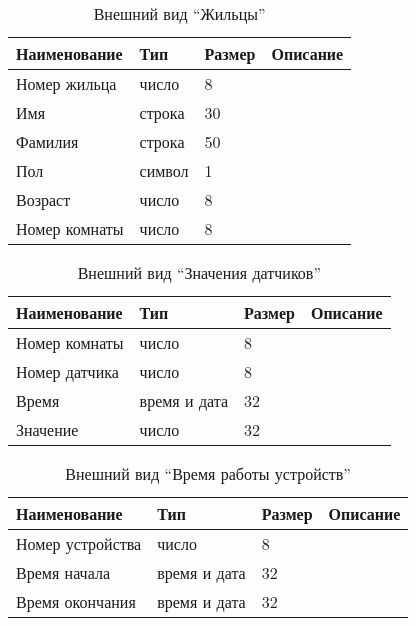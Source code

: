          \begin{table}[h!]
            \centering
            \caption{Внешний вид “Жильцы”}
            \label{sensor:size}
            \begin{tabular}{|l|l|l|l|}
            \hline
            Наименование & Тип & Размер & Описание \\ \hline
            Номер жильца & число & 8 & \\ \hline
            Имя & строка & 30 & \\ \hline
            Фамилия & строка & 50 & \\ \hline
            Пол & символ & 1 & \\ \hline
            Возраст & число & 8 & \\ \hline
            Номер комнаты & число & 8 & \\ \hline
            \end{tabular}
          \end{table}
          \begin{table}[h!]
            \centering
            \caption{Внешний вид “Значения датчиков”}
            \label{room:size}
            \begin{tabular}{|l|l|l|l|}
            \hline
            Наименование & Тип & Размер & Описание \\ \hline
            Номер комнаты & число & 8 & \\ \hline
            Номер датчика & число & 8 & \\ \hline
            Время & время и дата & 32 & \\ \hline
            Значение & число & 32 & \\ \hline
            \end{tabular}
          \end{table}
          \begin{table}[h!]
            \centering
            \caption{Внешний вид “Время работы устройств”}
            \label{room:size}
            \begin{tabular}{|l|l|l|l|}
            \hline
            Наименование & Тип & Размер & Описание \\ \hline
            Номер устройства & число & 8 & \\ \hline
            Время начала & время и дата & 32 &          \\ \hline
            Время окончания & время и дата & 32 &          \\ \hline
            \end{tabular}
          \end{table}
